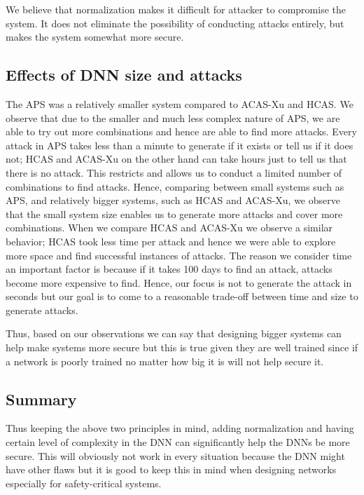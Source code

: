 We believe that normalization makes it difficult for attacker to compromise the system. 
It does not eliminate the possibility of conducting attacks entirely, but makes the system somewhat more secure. 

\subsection{Effects of DNN size and attacks}
The \ac{APS} was a relatively smaller system compared to \ac{ACAS-Xu} and \ac{HCAS}.
We observe that due to the smaller and much less complex nature of \ac{APS}, we are able to try out more combinations and hence are able to find more attacks. 
Every attack in \ac{APS} takes less than a minute to generate if it exists or tell us if it does not; \ac{HCAS} and \ac{ACAS-Xu} on the other hand can take hours just to tell us that there is no attack. 
This restricts and allows us to conduct a limited number of combinations to find attacks. 
Hence, comparing between small systems such as \ac{APS}, and relatively bigger systems, such as \ac{HCAS} and \ac{ACAS-Xu}, we observe that the small system size enables us to generate more attacks and cover more combinations. 
When we compare \ac{HCAS} and \ac{ACAS-Xu} we observe a similar behavior; \ac{HCAS} took less time per attack and hence we were able to explore more space and find successful instances of attacks. 
The reason we consider time an important factor is because if it takes 100 days to find an attack, attacks become more expensive to find. 
Hence, our focus is not to generate the attack in seconds but our goal is to come to a reasonable trade-off between time and size to generate attacks. 

Thus, based on our observations we can say that designing bigger systems can help make systems more secure but this is true given they are well trained since if a network is poorly trained no matter how big it is will not help secure it. 




\subsection{Summary}
Thus keeping the above two principles in mind, adding normalization and having certain level of complexity in the \ac{DNN} can significantly help the \ac{DNN}s be more secure. 
This will obviously not work in every situation because the \ac{DNN} might have other flaws but it is good to keep this in mind when designing networks especially for safety-critical systems. 

